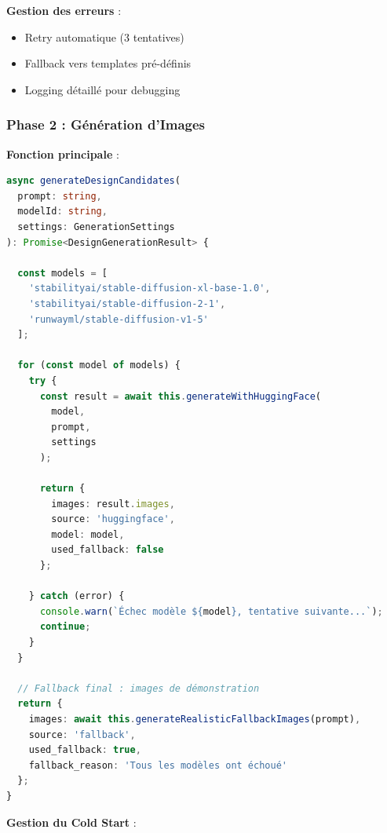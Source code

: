 \textbf{Gestion des erreurs} :

\begin{itemize}[leftmargin=*]
    \item Retry automatique (3 tentatives)
    \item Fallback vers templates pré-définis
    \item Logging détaillé pour debugging
\end{itemize}

\subsubsection{Phase 2 : Génération d'Images}

\textbf{Fonction principale} :

\begin{lstlisting}[language=TypeScript, caption=Génération d'images avec Stable Diffusion]
async generateDesignCandidates(
  prompt: string,
  modelId: string,
  settings: GenerationSettings
): Promise<DesignGenerationResult> {
  
  const models = [
    'stabilityai/stable-diffusion-xl-base-1.0',
    'stabilityai/stable-diffusion-2-1',
    'runwayml/stable-diffusion-v1-5'
  ];
  
  for (const model of models) {
    try {
      const result = await this.generateWithHuggingFace(
        model, 
        prompt, 
        settings
      );
      
      return {
        images: result.images,
        source: 'huggingface',
        model: model,
        used_fallback: false
      };
      
    } catch (error) {
      console.warn(`Échec modèle ${model}, tentative suivante...`);
      continue;
    }
  }
  
  // Fallback final : images de démonstration
  return {
    images: await this.generateRealisticFallbackImages(prompt),
    source: 'fallback',
    used_fallback: true,
    fallback_reason: 'Tous les modèles ont échoué'
  };
}
\end{lstlisting}

\textbf{Gestion du Cold Start} :

